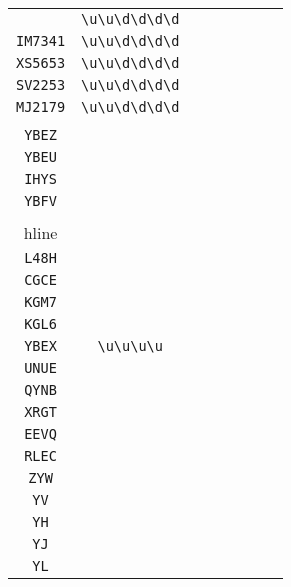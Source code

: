 \begin{longtable}{cccccccc}
\begin{tabular}{ll}
    \verb|DO4180| & \verb|\u\u\d\d\d\d|\\
\verb|IM7341| & \verb|\u\u\d\d\d\d|\\
\verb|XS5653| & \verb|\u\u\d\d\d\d|\\
\verb|SV2253| & \verb|\u\u\d\d\d\d|\\
\verb|MJ2179| & \verb|\u\u\d\d\d\d|
\end{tabular}
\\\midrule 
\begin{tabular}{l}
    \verb|IHYP|\\
\verb|YBEZ|\\
\verb|YBEU|\\
\verb|IHYS|\\
\verb|YBFV|\\
\\hline\\
\verb|L48H|\\
\verb|CGCE|\\
\verb|KGM7|\\
\verb|KGL6|\\
\verb|YBEX|
\end{tabular}

&
\verb|\u\u\u\u|
&

\begin{tabular}{l}
    \verb|\u\u\u\u|\\
\verb|UNUE|\\
\verb|QYNB|\\
\verb|XRGT|\\
\verb|EEVQ|\\
\verb|RLEC|
\end{tabular}

&

\begin{tabular}{l}
    \verb|(\u)*Y(\u)*\u|\\
\verb|ZYW|\\
\verb|YV|\\
\verb|YH|\\
\verb|YJ|\\
\verb|YL|
\end{tabular}

&


\end{longtable}
